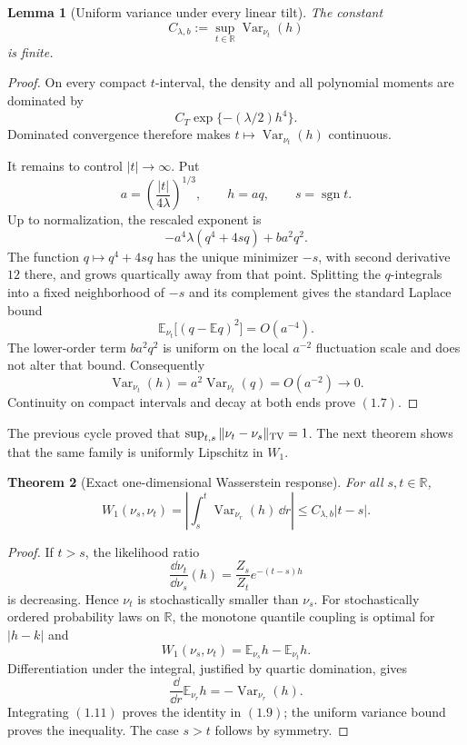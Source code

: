 \documentclass[11pt]{article}
\newtheorem{theorem}{Theorem}[section]
\newtheorem{lemma}[theorem]{Lemma}
\theoremstyle{remark}
\begin{document}
\begin{lemma}[Uniform variance under every linear tilt]
\label{lem:v15v1-uniform-variance}
The constant
\[
 C_{\lambda,b}:=\sup_{t\in\mathbb R}
 \operatorname{Var}_{\nu_t}(h)                               \tag{1.7}
\]
is finite.
\end{lemma}

\begin{proof}
On every compact \(t\)-interval, the density and all polynomial
moments are dominated by
\[
 C_T\exp\{-(\lambda/2)h^4\}.
\]
Dominated convergence therefore makes
\(t\mapsto\operatorname{Var}_{\nu_t}(h)\) continuous.

It remains to control \(|t|\to\infty\).  Put
\[
 a=\left(\frac{|t|}{4\lambda}\right)^{1/3},
 \qquad h=aq,\qquad s=\operatorname{sgn}t.
\]
Up to normalization, the rescaled exponent is
\[
 -a^4\lambda(q^4+4sq)+ba^2q^2.                              \tag{1.8}
\]
The function \(q\mapsto q^4+4sq\) has the unique minimizer
\(-s\), with second derivative \(12\) there, and grows quartically
away from that point.  Splitting the \(q\)-integrals into a fixed
neighborhood of \(-s\) and its complement gives the standard
Laplace bound
\[
 \mathbb E_{\nu_t}\bigl[(q-\mathbb E q)^2\bigr]=O(a^{-4}).
\]
The lower-order term \(ba^2q^2\) is uniform on the local
\(a^{-2}\) fluctuation scale and does not alter that bound.
Consequently
\[
 \operatorname{Var}_{\nu_t}(h)
 =a^2\operatorname{Var}_{\nu_t}(q)=O(a^{-2})\longrightarrow0.
\]
Continuity on compact intervals and decay at both ends prove
\((1.7)\).
\end{proof}

The previous cycle proved that
\(\sup_{t,s}\|\nu_t-\nu_s\|_{\rm TV}=1\).  The next theorem shows
that the same family is uniformly Lipschitz in \(W_1\).

\begin{theorem}[Exact one-dimensional Wasserstein response]
\label{thm:v15v1-w1-response}
For all \(s,t\in\mathbb R\),
\[
 \boxed{
 W_1(\nu_s,\nu_t)
 =\left|\int_s^t\operatorname{Var}_{\nu_r}(h)\,\dd r\right|
 \le C_{\lambda,b}|t-s|.}                                    \tag{1.9}
\]
\end{theorem}

\begin{proof}
If \(t>s\), the likelihood ratio
\[
 \frac{\dd\nu_t}{\dd\nu_s}(h)
 =\frac{Z_s}{Z_t}e^{-(t-s)h}
\]
is decreasing.  Hence \(\nu_t\) is stochastically smaller than
\(\nu_s\).  For stochastically ordered probability laws on
\(\mathbb R\), the monotone quantile coupling is optimal for
\(|h-k|\) and
\[
 W_1(\nu_s,\nu_t)
 =\mathbb E_{\nu_s}h-\mathbb E_{\nu_t}h.                     \tag{1.10}
\]
Differentiation under the integral, justified by quartic
domination, gives
\[
 \frac{\dd}{\dd r}\mathbb E_{\nu_r}h
 =-\operatorname{Var}_{\nu_r}(h).                            \tag{1.11}
\]
Integrating \((1.11)\) proves the identity in \((1.9)\); the
uniform variance bound proves the inequality.  The case \(s>t\)
follows by symmetry.
\end{proof}
\end{document}
